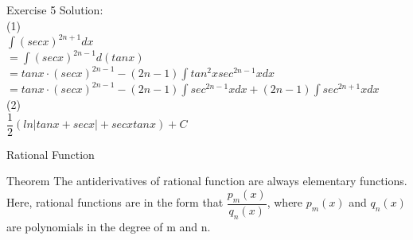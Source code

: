 \begin{frame}{Exercise 5}
    Solution:\\
    (1)\\
    $\int(secx)^{2n+1}dx$\\$=\int(secx)^{2n-1}d(tanx)$\\
    $=tanx\cdot(secx)^{2n-1}-(2n-1)\int tan^2x sec^{2n-1}xdx$\\
    $=tanx\cdot(secx)^{2n-1}-(2n-1)\int sec^{2n-1}xdx+(2n-1)\int sec^{2n+1}xdx$\\
        (2)\\
    $\dfrac{1}{2}(ln|tanx+secx|+secxtanx)+C$
\end{frame}

\begin{frame}{Rational Function}
    \begin{block}{Theorem}
        The antiderivatives of rational function are always elementary functions.\\
        Here, rational functions are in the form that $\dfrac{p_m(x)}{q_n(x)}$, where $p_m(x)$ and $q_n(x)$ are polynomials in the degree of m and n.
    \end{block}

\end{frame}

